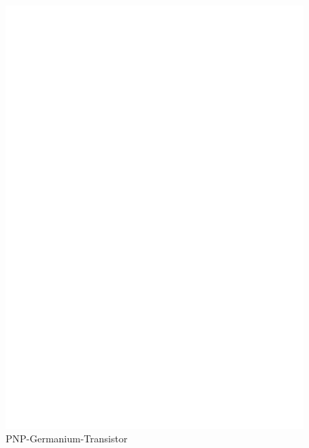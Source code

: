 \begin{figure}[H]
\centering
\includegraphics[]{../FIG/BJT_AD162.eps}
\caption{PNP-Germanium-Transistor}
\label{fig:BJT-PNP-Ge}
\end{figure}

